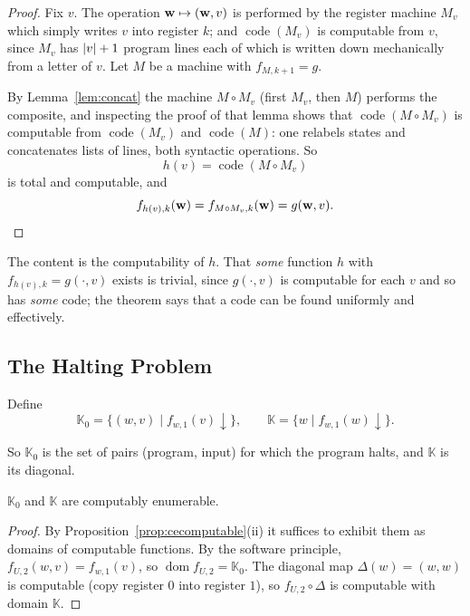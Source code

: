 \documentclass[a4paper]{scrartcl}
\newcommand{\KK}{\mathbb{K}}
\newcommand{\dom}{\operatorname{dom}}
\newcommand{\code}{\operatorname{code}}
\begin{document}
\begin{proof}
	Fix $v$. The operation $\mathbf{w} \mapsto (\mathbf{w}, v)$ is performed by the register machine $M_v$ which simply writes $v$ into register $k$; and $\code(M_v)$ is computable from $v$, since $M_v$ has $\lvert v\rvert+1$ program lines each of which is written down mechanically from a letter of $v$. Let $M$ be a machine with $f_{M,k+1} = g$.

	By Lemma~\ref{lem:concat} the machine $M \circ M_v$ (first $M_v$, then $M$) performs the composite, and inspecting the proof of that lemma shows that $\code(M\circ M_v)$ is computable from $\code(M_v)$ and $\code(M)$: one relabels states and concatenates lists of lines, both syntactic operations. So
	$$h(v) = \code(M \circ M_v)$$
	is total and computable, and
	$$f_{h(v),k}(\mathbf{w}) = f_{M\circ M_v, k}(\mathbf{w}) = g(\mathbf{w}, v). \qedhere$$
\end{proof}

\begin{remark}
	The content is the computability of $h$. That \emph{some} function $h$ with $f_{h(v),k} = g(\cdot,v)$ exists is trivial, since $g(\cdot,v)$ is computable for each $v$ and so has \emph{some} code; the theorem says that a code can be found uniformly and effectively.
\end{remark}

\subsection{The Halting Problem}

\begin{definition}
	Define
	$$\KK_0 = \{(w,v) \mid f_{w,1}(v)\!\downarrow\}, \qquad \KK = \{w \mid f_{w,1}(w)\!\downarrow\}.$$
\end{definition}

So $\KK_0$ is the set of pairs (program, input) for which the program halts, and $\KK$ is its diagonal.

\begin{theorem}
	$\KK_0$ and $\KK$ are computably enumerable.
\end{theorem}

\begin{proof}
	By Proposition~\ref{prop:cecomputable}(ii) it suffices to exhibit them as domains of computable functions. By the software principle, $f_{U,2}(w,v) = f_{w,1}(v)$, so $\dom f_{U,2} = \KK_0$. The diagonal map $\Delta(w) = (w,w)$ is computable (copy register $0$ into register $1$), so $f_{U,2}\circ\Delta$ is computable with domain $\KK$.
\end{proof}
\end{document}
